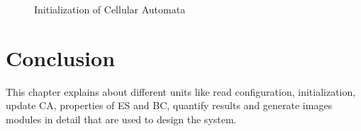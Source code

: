     \begin{figure}[H]
	  \centering
	  \caption{Initialization of Cellular Automata}
	  \label{Initialization}
  \end{figure}

  
  

\section{Conclusion}
This chapter explains about different units like read configuration, initialization, update CA, properties of ES and BC, 
quantify results and generate images modules in detail that are used to design the system.



